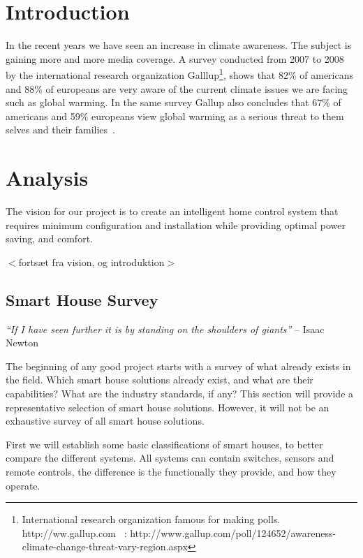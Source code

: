 \def\mytitle{KIIIB}
\def\myauthor{Andreas Moller s042809, David Emil Lemvigh s042809}
\def\affiliation{IMM@DTU}

\chapter{Introduction}
\label{introduction}

In the recent years we have seen an increase in climate awareness. The subject is gaining more and more media coverage. A survey conducted from 2007 to 2008 by the international research organization Galllup\footnote{International research organization famous for making polls. http:/\slash ww.gallup.com
~\citep{gallup-2009}: http:/\slash www.gallup.com\slash poll\slash 124652\slash awareness-climate-change-threat-vary-region.aspx}, shows that 82\% of americans and 88\% of europeans are very aware of the current climate issues we are facing such as global warming. In the same survey Gallup also concludes that 67\% of americans and 59\% europeans view global warming as a serious threat to them selves and their families~\citep{gallup-2009}.

\chapter{Analysis}
\label{analysis}

The vision for our project is to create an intelligent home control system that requires minimum configuration and installation while providing optimal power saving, and comfort. 

$<$fortsæt fra vision, og introduktion$>$

\section{Smart House Survey}
\label{smarthousesurvey}

\emph{``If I have seen further it is by standing on the shoulders of giants''} -- Isaac Newton

The beginning of any good project starts with a survey of what already exists in the field. Which smart house solutions already exist, and what are their capabilities? What are the industry standards, if any? This section will provide a representative selection of smart house solutions. However, it will not be an exhaustive survey of all smart house solutions.

First we will establish some basic classifications of smart houses, to better compare the different systems. All systems can contain switches, sensors and remote controls, the difference is the functionally they provide, and how they operate.

